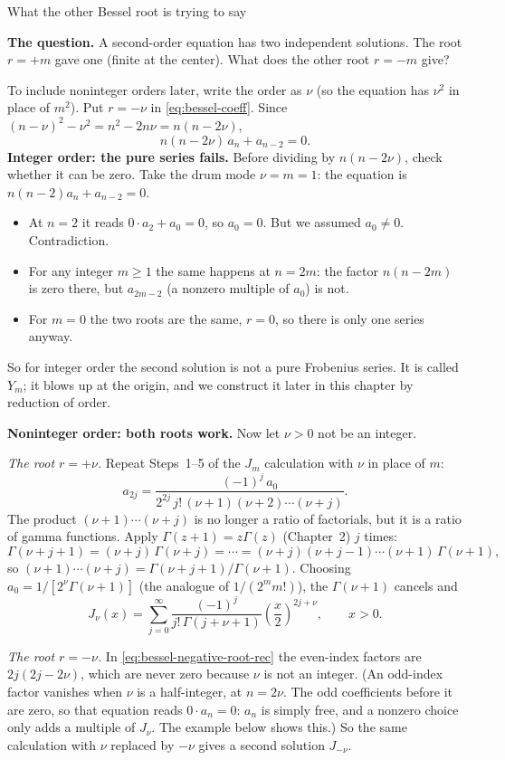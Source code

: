 \documentclass[11pt]{beamer}
\begin{document}
\begin{frame}[allowframebreaks=1.00]{What the other Bessel root is trying to say}
\footnotesize

\textbf{The question.} A second-order equation has two independent solutions. The root \(r=+m\)
gave one (finite at the center). What does the other root \(r=-m\) give?

To include noninteger orders later, write the order as \(\nu\) (so the equation has \(\nu^2\) in place of
\(m^2\)). Put \(r=-\nu\) in \eqref{eq:bessel-coeff}. Since \((n-\nu)^2-\nu^2=n^2-2n\nu=n(n-2\nu)\),
\begin{equation}
 n(n-2\nu)\,a_n+a_{n-2}=0.
 \label{eq:bessel-negative-root-rec}
\end{equation}
\textbf{Integer order: the pure series fails.} Before dividing by \(n(n-2\nu)\), check whether it can
be zero. Take the drum mode \(\nu=m=1\): the equation is \(n(n-2)a_n+a_{n-2}=0\).
\begin{itemize}
  \item At \(n=2\) it reads \(0\cdot a_2+a_0=0\), so \(a_0=0\). But we assumed \(a_0\ne0\). Contradiction.
  \item For any integer \(m\ge1\) the same happens at \(n=2m\): the factor \(n(n-2m)\) is zero there, but
        \(a_{2m-2}\) (a nonzero multiple of \(a_0\)) is not.
  \item For \(m=0\) the two roots are the same, \(r=0\), so there is only one series anyway.
\end{itemize}
So for integer order the second solution is not a pure Frobenius series. It is called \(Y_m\); it
blows up at the origin, and we construct it later in this chapter by reduction of order.
\par\framebreak\par
\textbf{Noninteger order: both roots work.} Now let \(\nu>0\) not be an integer.

\emph{The root \(r=+\nu\).} Repeat Steps~1--5 of the \(J_m\) calculation with \(\nu\) in place of \(m\):
\[
 a_{2j}=\frac{(-1)^j\,a_0}{2^{2j}\,j!\,(\nu+1)(\nu+2)\cdots(\nu+j)} .
\]
The product \((\nu+1)\cdots(\nu+j)\) is no longer a ratio of factorials, but it is a ratio of gamma
functions. Apply \(\Gamma(z+1)=z\Gamma(z)\) (Chapter~2) \(j\) times:
\[
 \Gamma(\nu+j+1)=(\nu+j)\,\Gamma(\nu+j)=\cdots=(\nu+j)(\nu+j-1)\cdots(\nu+1)\,\Gamma(\nu+1),
\]
so \((\nu+1)\cdots(\nu+j)=\Gamma(\nu+j+1)/\Gamma(\nu+1)\). Choosing \(a_0=1/[2^\nu\Gamma(\nu+1)]\) (the analogue of
\(1/(2^mm!)\)), the \(\Gamma(\nu+1)\) cancels and
\[
 J_{\nu}(x)=\sum_{j=0}^{\infty}
 \frac{(-1)^j}{j!\,\Gamma(j+\nu+1)}\left(\frac{x}{2}\right)^{2j+\nu},
 \qquad x>0.
\]
\par\framebreak\par
\emph{The root \(r=-\nu\).} In \eqref{eq:bessel-negative-root-rec} the even-index factors are
\(2j(2j-2\nu)\), which are never zero because \(\nu\) is not an integer. (An odd-index factor vanishes
when \(\nu\) is a half-integer, at \(n=2\nu\). The odd coefficients before it are zero, so that equation
reads \(0\cdot a_n=0\): \(a_n\) is simply free, and a nonzero choice only adds a multiple of \(J_\nu\). The
example below shows this.) So the same calculation with \(\nu\)
replaced by \(-\nu\) gives a second solution \(J_{-\nu}\).


\end{frame}
\end{document}
